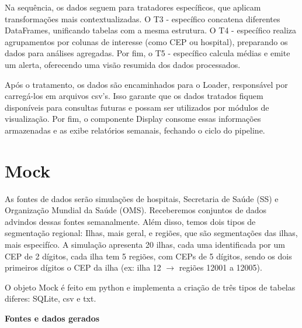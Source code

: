 \documentclass[a4paper,12pt]{article}
\begin{document}
Na sequência, os dados seguem para tratadores específicos, que aplicam transformações mais contextualizadas. O T3 - específico concatena diferentes DataFrames, unificando tabelas com a mesma estrutura. O T4 - específico realiza agrupamentos por colunas de interesse (como CEP ou hospital), preparando os dados para análises agregadas. Por fim, o T5 - específico calcula médias e emite um alerta, oferecendo uma visão resumida dos dados processados.

Após o tratamento, os dados são encaminhados para o Loader, responsável por carregá-los em arquivos csv's. Isso garante que os dados tratados fiquem disponíveis para consultas futuras e possam ser utilizados por módulos de visualização. Por fim, o componente Display consome essas informações armazenadas e as exibe relatórios semanais, fechando o ciclo do pipeline. 

\section{Mock}

As fontes de dados serão simulações de hospitais,  Secretaria de Saúde (SS) e Organização Mundial da Saúde (OMS). Receberemos conjuntos de dados advindos dessas fontes semanalmente. Além disso, temos dois tipos de segmentação regional: Ilhas, mais geral, e regiões, que são segmentações das ilhas, mais especifíco. A simulação apresenta 20 ilhas, cada uma identificada por um CEP de 2 dígitos, cada ilha tem 5 regiões, com CEPs de 5 dígitos, sendo os dois primeiros dígitos o CEP da ilha (ex: ilha 12 $\rightarrow$ regiões 12001 a 12005).


O objeto Mock é feito em python e implementa a criação de três tipos de tabelas diferes: SQLite, csv e txt.
\vspace{0.5cm}

\textbf{Fontes e dados gerados}
\end{document}
